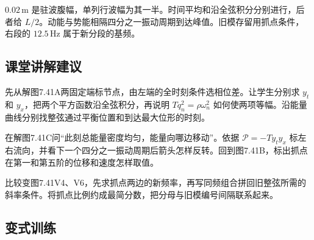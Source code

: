 \documentclass[UTF8,fontset=fandol,a4paper,11pt]{ctexart}
\begin{document}
$0.02\,\mathrm m$ 是驻波腹幅，单列行波幅为其一半。时间平均和沿全弦积分分别进行，后者给 $L/2$。动能与势能相隔四分之一振动周期到达峰值。旧模存留用抓点条件，右段的 $12.5\,\mathrm{Hz}$ 属于新分段的基频。




\subsection*{课堂讲解建议}

先从解图7.41A两固定端标节点，由左端的全时刻条件选相位差。让学生分别求 $y_t$ 和 $y_x$，把两个平方函数沿全弦积分，再说明 $Tq_n^2=\rho\omega_n^2$ 如何使两项等幅。沿能量曲线分别找整弦通过平衡位置和到达最大位形的时刻。

在解图7.41C问“此刻总能量密度均匀，能量向哪边移动”。依据 $\mathcal P=-Ty_ty_x$ 标左右流向，并看下一个四分之一振动周期后箭头怎样反转。回到图7.41B，标出抓点在第一和第五阶的位移和速度怎样取值。

比较变图7.41V4、V6，先求抓点两边的新频率，再写同频组合拼回旧整弦所需的斜率条件。将抓点比例约成最简分数，把分母与旧模编号间隔联系起来。




\subsection*{变式训练}
\end{document}
